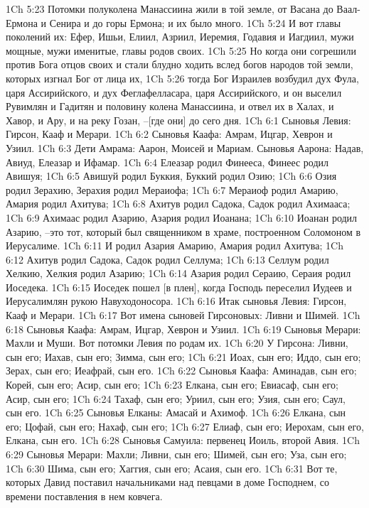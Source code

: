 1Ch 5:23  Потомки полуколена Манассиина жили в той земле, от Васана до Ваал-Ермона и Сенира и до горы Ермона; и их было много.
1Ch 5:24  И вот главы поколений их: Ефер, Ишьи, Елиил, Азриил, Иеремия, Годавия и Иагдиил, мужи мощные, мужи именитые, главы родов своих.
1Ch 5:25  Но когда они согрешили против Бога отцов своих и стали блудно ходить вслед богов народов той земли, которых изгнал Бог от лица их,
1Ch 5:26  тогда Бог Израилев возбудил дух Фула, царя Ассирийского, и дух Феглафелласара, царя Ассирийского, и он выселил Рувимлян и Гадитян и половину колена Манассиина, и отвел их в Халах, и Хавор, и Ару, и на реку Гозан, --[где они] до сего дня.
1Ch 6:1  Сыновья Левия: Гирсон, Кааф и Мерари.
1Ch 6:2  Сыновья Каафа: Амрам, Ицгар, Хеврон и Узиил.
1Ch 6:3  Дети Амрама: Аарон, Моисей и Мариам. Сыновья Аарона: Надав, Авиуд, Елеазар и Ифамар.
1Ch 6:4  Елеазар родил Финееса, Финеес родил Авишуя;
1Ch 6:5  Авишуй родил Буккия, Буккий родил Озию;
1Ch 6:6  Озия родил Зерахию, Зерахия родил Мераиофа;
1Ch 6:7  Мераиоф родил Амарию, Амария родил Ахитува;
1Ch 6:8  Ахитув родил Садока, Садок родил Ахимааса;
1Ch 6:9  Ахимаас родил Азарию, Азария родил Иоанана;
1Ch 6:10  Иоанан родил Азарию, --это тот, который был священником в храме, построенном Соломоном в Иерусалиме.
1Ch 6:11  И родил Азария Амарию, Амария родил Ахитува;
1Ch 6:12  Ахитув родил Садока, Садок родил Селлума;
1Ch 6:13  Селлум родил Хелкию, Хелкия родил Азарию;
1Ch 6:14  Азария родил Сераию, Сераия родил Иоседека.
1Ch 6:15  Иоседек пошел [в плен], когда Господь переселил Иудеев и Иерусалимлян рукою Навуходоносора.
1Ch 6:16  Итак сыновья Левия: Гирсон, Кааф и Мерари.
1Ch 6:17  Вот имена сыновей Гирсоновых: Ливни и Шимей.
1Ch 6:18  Сыновья Каафа: Амрам, Ицгар, Хеврон и Узиил.
1Ch 6:19  Сыновья Мерари: Махли и Муши. Вот потомки Левия по родам их.
1Ch 6:20  У Гирсона: Ливни, сын его; Иахав, сын его; Зимма, сын его;
1Ch 6:21  Иоах, сын его; Иддо, сын его; Зерах, сын его; Иеафрай, сын его.
1Ch 6:22  Сыновья Каафа: Аминадав, сын его; Корей, сын его; Асир, сын его;
1Ch 6:23  Елкана, сын его; Евиасаф, сын его; Асир, сын его;
1Ch 6:24  Тахаф, сын его; Уриил, сын его; Узия, сын его; Саул, сын его.
1Ch 6:25  Сыновья Елканы: Амасай и Ахимоф.
1Ch 6:26  Елкана, сын его; Цофай, сын его; Нахаф, сын его;
1Ch 6:27  Елиаф, сын его; Иерохам, сын его, Елкана, сын его.
1Ch 6:28  Сыновья Самуила: первенец Иоиль, второй Авия.
1Ch 6:29  Сыновья Мерари: Махли; Ливни, сын его; Шимей, сын его; Уза, сын его;
1Ch 6:30  Шима, сын его; Хаггия, сын его; Асаия, сын его.
1Ch 6:31  Вот те, которых Давид поставил начальниками над певцами в доме Господнем, со времени поставления в нем ковчега.
